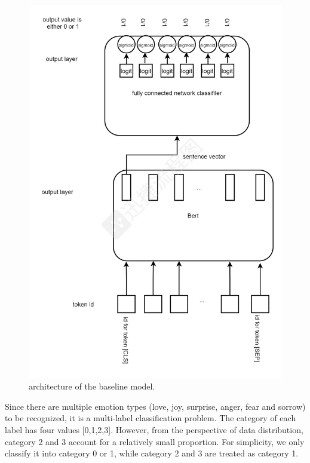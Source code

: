 \documentclass[12pt,twocolumn,letterpaper]{article}
\begin{document}
\begin{figure}
\begin{center}
\includegraphics[scale=0.22]{Method1.png}
\end{center}
   \caption{architecture of the baseline model.}
\label{fig:short}
\end{figure}


 Since there are multiple emotion types (love, joy, surprise, anger, fear and sorrow) to be recognized, it is a multi-label classification problem. The category of each label has four values [0,1,2,3]. However, from the perspective of data distribution, category 2 and 3 account for a relatively small proportion. For simplicity, we only classify it into category 0 or 1, while category 2 and 3 are treated as category 1. 
 
\end{document}
